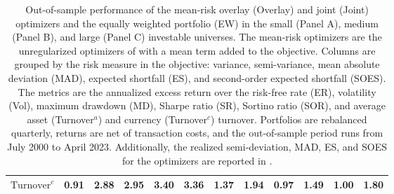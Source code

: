 \begin{table}[tbp]
{\begin{tabular}{l*{11}{c}}
    $\text{Turnover}^c$      & 0.91             & 2.88             & 2.95             & 3.40             & 3.36             & 1.37             & 1.94             & 0.97             & 1.49             & 1.00             & 1.80 \\
    \bottomrule
  \end{tabular}%
}
  \caption{Out-of-sample performance of the mean-risk overlay (Overlay) and joint (Joint) optimizers and the equally weighted portfolio (EW) in the small (Panel A), medium (Panel B), and large (Panel C) investable universes. The mean-risk optimizers are the unregularized optimizers of  with a mean term added to the objective. Columns are grouped by the risk measure in the objective: variance, semi-variance, mean absolute deviation (MAD), expected shortfall (ES), and second-order expected shortfall (SOES). The metrics are the annualized excess return over the risk-free rate (ER), volatility (Vol), maximum drawdown (MD), Sharpe ratio (SR), Sortino ratio (SOR), and average asset (Turnover$^a$) and currency (Turnover$^c$) turnover. Portfolios are rebalanced quarterly, returns are net of transaction costs, and the out-of-sample period runs from July 2000 to April 2023. Additionally, the realized semi-deviation, MAD, ES, and SOES for the optimizers are reported in .}
  \label{tab:mean-risk}
\end{table}

